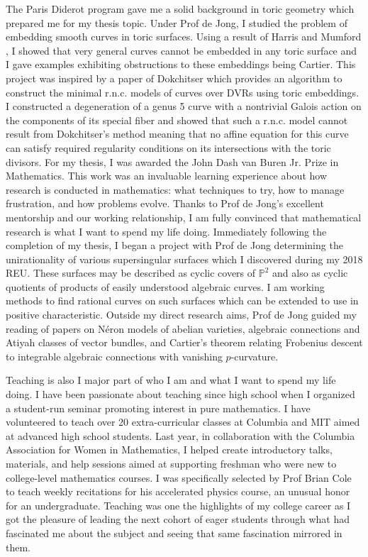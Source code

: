 \documentclass[11pt]{article}
\begin{document}
The Paris Diderot program gave me a solid background in toric geometry which prepared me for my thesis topic. Under Prof  de Jong, I studied the problem of embedding smooth curves in toric surfaces. Using a result of Harris and Mumford , I showed that very general curves cannot be embedded in any toric surface and I gave examples exhibiting obstructions to these embeddings being Cartier. This project was inspired by a paper of Dokchitser  which provides an algorithm to construct the minimal r.n.c. models of curves over DVRs using toric embeddings. I constructed a degeneration of a genus 5 curve with a nontrivial Galois action on the components of its special fiber and showed that such a r.n.c. model cannot result from Dokchitser's method meaning that no affine equation for this curve can satisfy required regularity conditions on its intersections with the toric divisors. For my thesis, I was awarded the John Dash van Buren Jr. Prize in Mathematics. This work was an invaluable learning experience about how research is conducted in mathematics: what techniques to try, how to manage frustration, and how problems evolve. Thanks to Prof de Jong’s excellent mentorship and our working relationship, I am fully convinced that mathematical research is what I want to spend my life doing. Immediately following the completion of my thesis, I began a project with Prof de Jong determining the unirationality of various supersingular surfaces which I discovered during my 2018 REU. These surfaces may be described as cyclic covers of $\mathbb{P}^2$ and also as cyclic quotients of products of easily understood algebraic curves. I am working methods to find rational curves on such surfaces which can be extended to use in positive characteristic. Outside my direct research aims, Prof de Jong guided my reading of papers on N\'{e}ron models of abelian varieties, algebraic connections and Atiyah classes of vector bundles, and Cartier's theorem relating Frobenius descent to integrable algebraic connections with vanishing $p$-curvature.
\par
Teaching is also I major part of who I am and what I want to spend my life doing. I have been passionate about teaching since high school when I organized a student-run seminar promoting interest in pure mathematics. I have volunteered to teach over 20 extra-curricular classes at Columbia and MIT aimed at advanced high school students. Last year, in collaboration with the Columbia Association for Women in Mathematics, I helped create introductory talks, materials, and help sessions aimed at supporting freshman who were new to college-level mathematics courses. I was specifically selected by Prof Brian Cole to teach weekly recitations for  his accelerated physics course, an unusual honor for an undergraduate. Teaching was one the highlights of my college career as I got the pleasure of leading the next cohort of eager students through what had fascinated me about the subject and seeing that same fascination mirrored in them.
\end{document}
